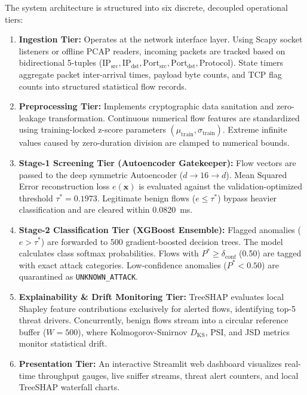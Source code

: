 \documentclass[12pt,a4paper]{report}
\begin{document}
The system architecture is structured into six discrete, decoupled operational tiers:
\begin{enumerate}
    \item \textbf{Ingestion Tier:} Operates at the network interface layer. Using Scapy socket listeners or offline PCAP readers, incoming packets are tracked based on bidirectional 5-tuples ($\text{IP}_{\text{src}}, \text{IP}_{\text{dst}}, \text{Port}_{\text{src}}, \text{Port}_{\text{dst}}, \text{Protocol}$). State timers aggregate packet inter-arrival times, payload byte counts, and TCP flag counts into structured statistical flow records.
    \item \textbf{Preprocessing Tier:} Implements cryptographic data sanitation and zero-leakage transformation. Continuous numerical flow features are standardized using training-locked z-score parameters $(\mu_{\text{train}}, \sigma_{\text{train}})$. Extreme infinite values caused by zero-duration division are clamped to numerical bounds.
    \item \textbf{Stage-1 Screening Tier (Autoencoder Gatekeeper):} Flow vectors are passed to the deep symmetric Autoencoder ($d \to 16 \to d$). Mean Squared Error reconstruction loss $e(\mathbf{x})$ is evaluated against the validation-optimized threshold $\tau^* = 0.1973$. Legitimate benign flows ($e \le \tau^*$) bypass heavier classification and are cleared within 0.0820~ms.
    \item \textbf{Stage-2 Classification Tier (XGBoost Ensemble):} Flagged anomalies ($e > \tau^*$) are forwarded to 500 gradient-boosted decision trees. The model calculates class softmax probabilities. Flows with $P^* \ge \delta_{\text{conf}}$ (0.50) are tagged with exact attack categories. Low-confidence anomalies ($P^* < 0.50$) are quarantined as \texttt{UNKNOWN\_ATTACK}.
    \item \textbf{Explainability \& Drift Monitoring Tier:} TreeSHAP evaluates local Shapley feature contributions exclusively for alerted flows, identifying top-5 threat drivers. Concurrently, benign flows stream into a circular reference buffer ($W=500$), where Kolmogorov-Smirnov $D_{\text{KS}}$, PSI, and JSD metrics monitor statistical drift.
    \item \textbf{Presentation Tier:} An interactive Streamlit web dashboard visualizes real-time throughput gauges, live sniffer streams, threat alert counters, and local TreeSHAP waterfall charts.
\end{enumerate}
\end{document}
